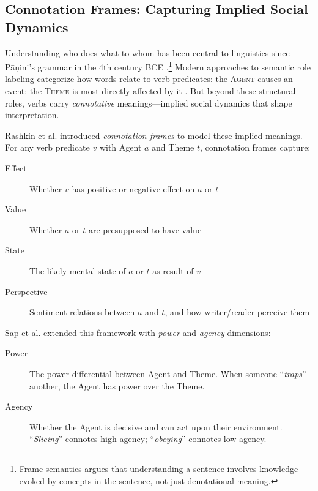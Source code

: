 \documentclass[../main.tex]{subfiles}
\begin{document}
\subsection{Connotation Frames: Capturing Implied Social Dynamics}

Understanding who does what to whom has been central to linguistics since P\=a\d{n}ini's grammar in the 4th century BCE \cite{fillmore1976frame}.\footnote{Frame semantics argues that understanding a sentence involves knowledge evoked by concepts in the sentence, not just denotational meaning.} Modern approaches to semantic role labeling categorize how words relate to verb predicates: the \textsc{Agent} causes an event; the \textsc{Theme} is most directly affected by it \cite{baker1998berkeley}. But beyond these structural roles, verbs carry \textit{connotative} meanings---implied social dynamics that shape interpretation.

Rashkin et al. \cite{rashkin2016connotation} introduced \textit{connotation frames} to model these implied meanings. For any verb predicate $v$ with Agent $a$ and Theme $t$, connotation frames capture:

\begin{description}
    \item[Effect] Whether $v$ has positive or negative effect on $a$ or $t$
    \item[Value] Whether $a$ or $t$ are presupposed to have value
    \item[State] The likely mental state of $a$ or $t$ as result of $v$
    \item[Perspective] Sentiment relations between $a$ and $t$, and how writer/reader perceive them
\end{description}

Sap et al. \cite{sap2017connotation} extended this framework with \textit{power} and \textit{agency} dimensions:

\begin{description}
    \item[Power] The power differential between Agent and Theme. When someone ``\textit{traps}'' another, the Agent has power over the Theme.
    \item[Agency] Whether the Agent is decisive and can act upon their environment. ``\textit{Slicing}'' connotes high agency; ``\textit{obeying}'' connotes low agency.
\end{description}
\end{document}

